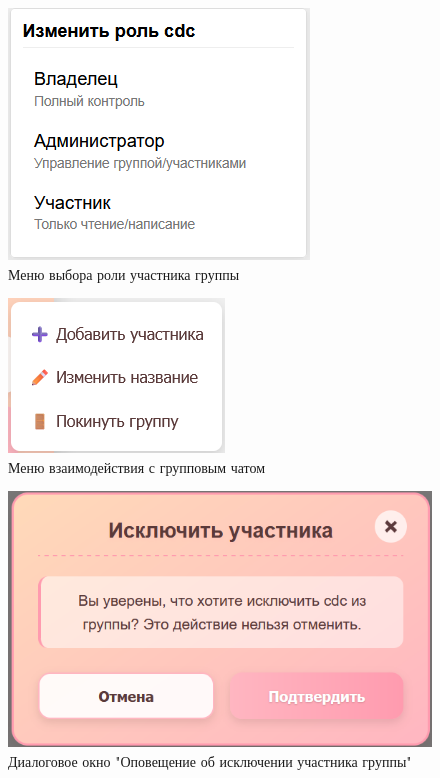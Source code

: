 \begin{figure}[H]
	\centering
	\includegraphics[width=0.7\linewidth]{"images/Меню с ролями"}
	\caption{Меню выбора роли участника группы}
	\label{fig:role-dialog}
\end{figure}

\begin{figure}[H]
	\centering
	\includegraphics[width=0.7\linewidth]{"images/Меню взаимодействия с групповым чатом "}
	\caption{Меню взаимодействия с групповым чатом}
	\label{fig:menu-group}
\end{figure}

\begin{figure}[H]
	\centering
	\includegraphics[width=0.8\linewidth]{"images/Окно уточнения исключения"}
	\caption{Диалоговое окно "Оповещение об исключении участника группы"}
	\label{fig:get-out-menu}
\end{figure}

